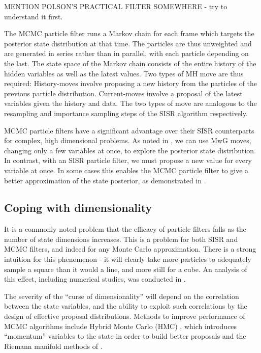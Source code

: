 MENTION POLSON'S PRACTICAL FILTER SOMEWHERE - try to understand it first.

The MCMC particle filter runs a Markov chain for each frame which targets the posterior state distribution at that time. The particles are thus unweighted and are generated in series rather than in parallel, with each particle depending on the last. The state space of the Markov chain consists of the entire history of the hidden variables as well as the latest values. Two types of MH move are thus required: History-moves involve proposing a new history from the particles of the previous particle distribution. Current-moves involve a proposal of the latest variables given the history and data. The two types of move are analogous to the resampling and importance sampling steps of the SISR algorithm respectively.

MCMC particle filters have a significant advantage over their SISR counterparts for complex, high dimensional problems. As noted in \cite{Pang2008}, we can use MwG moves, changing only a few variables at once, to explore the posterior state distribution. In contrast, with an SISR particle filter, we must propose a new value for every variable at once. In some cases this enables the MCMC particle filter to give a better approximation of the state posterior, as demonstrated in \cite{Pang2011}.



\subsection{Coping with dimensionality}
It is a commonly noted problem that the efficacy of particle filters falls as the number of state dimensions increases. This is a problem for both SISR and MCMC filters, and indeed for any Monte Carlo approximation. There is a strong intuition for this phenomenon - it will clearly take more particles to adequately sample a square than it would a line, and more still for a cube. An analysis of this effect, including numerical studies, was conducted in \cite{Daum2003}.

The severity of the ``curse of dimensionality'' will depend on the correlation between the state variables, and the ability to exploit such correlations by the design of effective proposal distributions. Methods to improve performance of MCMC algorithms include Hybrid Monte Carlo (HMC) \cite{Duane1987}, which introduces ``momentum'' variables to the state in order to build better proposals and the Riemann manifold methods of \cite{Girolami2011}.



